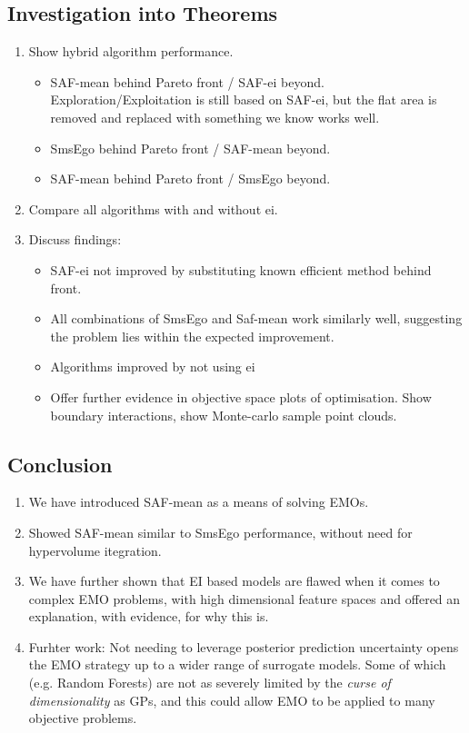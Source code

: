 \documentclass[runningheads]{llncs}
\begin{document}
\subsection{Investigation into Theorems}
\begin{enumerate}
    \item Show hybrid algorithm performance.
    \begin{itemize}
        \item SAF-mean behind Pareto front / SAF-ei beyond. Exploration/Exploitation is still based on SAF-ei, but the flat area is removed and replaced with something we know works well.
        \item SmsEgo behind Pareto front / SAF-mean beyond. 
        \item SAF-mean behind Pareto front / SmsEgo beyond. 
    \end{itemize}
    \item Compare all algorithms with and without ei. 
    \item Discuss findings:
        \begin{itemize}
            \item SAF-ei not improved by substituting known efficient method behind front.
            \item All combinations of SmsEgo and Saf-mean work similarly well, suggesting the problem lies within the expected improvement. 
            \item Algorithms improved by not using ei
            \item Offer further evidence in objective space plots of optimisation. Show boundary interactions, show Monte-carlo sample point clouds. 
        \end{itemize}
\end{enumerate}

\subsection{Conclusion}
\begin{enumerate}
    \item We have introduced SAF-mean as a means of solving EMOs.
    \item Showed SAF-mean similar to SmsEgo performance, without need for hypervolume itegration.
    \item We have further shown that EI based models are flawed when it comes to complex EMO problems, with high dimensional feature spaces and offered an explanation, with evidence, for why this is. 
    \item Furhter work: Not needing to leverage posterior prediction uncertainty opens the EMO strategy up to a wider range of surrogate models. Some of which (e.g. Random Forests) are not as severely limited by the \textit{curse of dimensionality} as GPs, and this could allow EMO to be applied to many objective problems. 
\end{enumerate}
\end{document}
